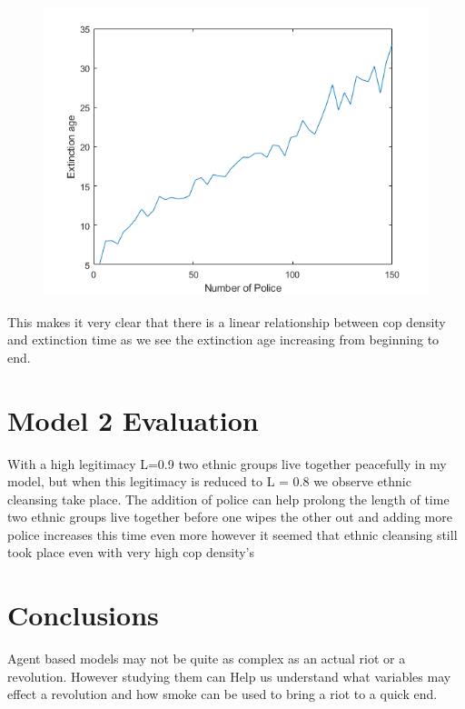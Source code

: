 \documentclass[11pt]{article}
\begin{document}
\begin{figure}[H]
	\includegraphics[width=\linewidth]{Extintion Age vs Police Density 150.png}
	\caption{}
	\label{fig:frenchriot}
\end{figure}

This makes it very clear that there is a linear relationship between cop density and extinction time as we see the extinction age increasing from beginning to end.

	
	\section{Model 2 Evaluation}
	With a high legitimacy L=0.9 two ethnic groups live together peacefully in my model, but when this legitimacy is reduced to L = 0.8 we observe ethnic cleansing take place. The addition of police can help prolong the length of time two ethnic groups live together before one wipes the other out and adding more police increases this time even more however it seemed that ethnic cleansing still took place even with very high cop density's
	\newpage
	
	\section{Conclusions}
	Agent based models may not be quite as complex as an actual riot or a revolution. However studying them can Help us understand what variables may effect a revolution and how smoke can be used to bring a riot to a quick end.
	
	
	
	
	
	
\end{document}
